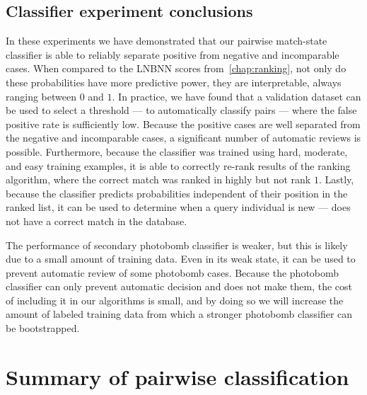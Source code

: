     \subsection{Classifier experiment conclusions}
        In these experiments we have demonstrated that our pairwise match-state classifier is able to reliably
          separate positive from negative and incomparable cases.
        When compared to the LNBNN scores from~\cref{chap:ranking}, not only do these probabilities have more
          predictive power, they are interpretable, always ranging between $0$ and $1$.
        In practice, we have found that a validation dataset can be used to select a threshold --- to
          automatically classify pairs --- where the false positive rate is sufficiently low.
        Because the positive cases are well separated from the negative and incomparable cases, a significant
          number of automatic reviews is possible.
        Furthermore, because the classifier was trained using hard, moderate, and easy training examples, it is
          able to correctly re-rank results of the ranking algorithm, where the correct match was ranked in highly
          but not rank $1$.
        Lastly, because the classifier predicts probabilities independent of their position in the ranked list,
          it can be used to determine when a query individual is new --- \ie{} does not have a correct match in the
          database.

        The performance of secondary photobomb classifier is weaker, but this is likely due to a small amount of
          training data.
        Even in its weak state, it can be used to prevent automatic review of some photobomb cases.
        Because the photobomb classifier can only prevent automatic decision and does not make them, the cost of
          including it in our algorithms is small, and by doing so we will increase the amount of labeled training
          data from which a stronger photobomb classifier can be bootstrapped.


\section{Summary of pairwise classification}\label{sec:pairconclusion}

